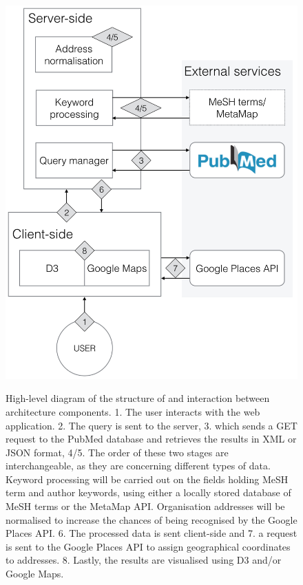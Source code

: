 \documentclass[PROP_AGutteridge_CS.tex]{subfiles}
\begin{document}
\begin{figure}
	\centering
	\includegraphics{../lib/images/system-arch}\\
 	\caption{High-level diagram of the structure of and interaction between architecture components. 1. The user interacts with the web application. 2. The query is sent to the server, 3. which sends a GET request to the PubMed database and retrieves the results in XML or JSON format, 4/5. The order of these two stages are interchangeable, as they are concerning different types of data. Keyword processing will be carried out on the fields holding MeSH term and author keywords, using either a locally stored database of MeSH terms or the MetaMap API. Organisation addresses will be normalised to increase the chances of being recognised by the Google Places API. 6. The processed data is sent client-side and 7. a request is sent to the Google Places API to assign geographical coordinates to addresses. 8. Lastly, the results are visualised using D3 and/or Google Maps.}
	\label{fig:SA}
\end{figure}
\end{document}
